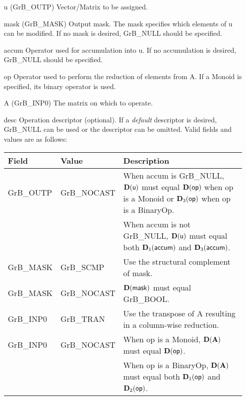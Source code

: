 \begin{itemize}[leftmargin=1.1in]
    \item[{\sf u}]   ({\sf GrB\_OUTP}) Vector/Matrix to be assigned.

    \item[{\sf mask}] ({\sf GrB\_MASK}) Output mask. The mask specifies which elements
    of {\sf u} can be modified. If no mask is desired, {\sf GrB\_NULL} should be specified.

    \item[{\sf accum}] Operator used for accumulation into {\sf u}.  If no accumulation
                        is desired, {\sf GrB\_NULL} should be specified.

    \item[{\sf op}]    Operator used to perform the reduction of elements from {\sf A}.  If a Monoid is specified, its binary operator is used.
    \item[{\sf A}]     ({\sf GrB\_INP0}) The matrix on which to operate.

    \item[{\sf desc}]   Operation descriptor (optional). If a
    \emph{default} descriptor is desired, {\sf GrB\_NULL} can be
    used or the descriptor can be omitted.  Valid fields and values are as follows: \\
    \begin{tabular}{llp{3in}}
    Field  & Value & Description \\
    \hline
    {\sf GrB\_OUTP} & {\sf GrB\_NOCAST} & When {\sf accum} is {\sf GrB\_NULL}, $\bold{D}({\sf u})$ must
                                          equal $\bold{D}({\sf op})$ when {\sf op} is a Monoid or 
                                          $\bold{D}_3({\sf op})$ when {\sf op} is a BinaryOp. \\
                    &                   & When {\sf accum} is not {\sf GrB\_NULL}, $\bold{D}({\sf u})$
                                          must equal both $\bold{D}_1({\sf accum})$ and $\bold{D}_3({\sf accum})$. \\
    {\sf GrB\_MASK} & {\sf GrB\_SCMP}   & Use the structural complement of {\sf mask}. \\
    {\sf GrB\_MASK} & {\sf GrB\_NOCAST} & $\bold{D}({\sf mask})$ must equal {\sf GrB\_BOOL}. \\
    {\sf GrB\_INP0} & {\sf GrB\_TRAN}   & Use the transpose of {\sf A} resulting in a 
    column-wise reduction. \\
    {\sf GrB\_INP0} & {\sf GrB\_NOCAST} & When {\sf op} is a Monoid, $\bold{D}({\bf A})$
                                          must equal $\bold{D}({\sf op})$.\\
                    &                   & When {\sf op} is a BinaryOp, $\bold{D}({\bf A})$ must equal
                                          both $\bold{D}_1({\sf op})$ and $\bold{D}_2({\sf op})$.\\
    \end{tabular}

\end{itemize}


